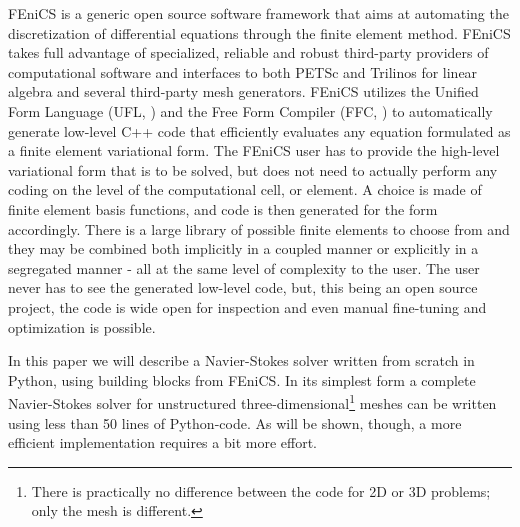 \documentclass[final,3p,times,twocolumn]{elsarticle}
\begin{document}

FEniCS \cite{fenics} is a generic open source software framework that aims at automating the discretization of differential equations through the finite element method. FEniCS takes full advantage of specialized, reliable and robust third-party providers of computational software and interfaces to both PETSc and Trilinos for linear algebra and several third-party mesh generators. FEniCS utilizes the Unified Form Language (UFL, \cite{ufl}) and the Free Form Compiler (FFC, \cite{Kirby:2006}) to automatically generate low-level C++ code that efficiently evaluates any equation formulated as a finite element variational form. The FEniCS user has to provide the high-level variational form that is to be solved, but does not need to actually perform any coding on the level of the computational cell, or element. A choice is made of finite element basis functions, and code is then generated for the form accordingly. There is a large library of possible finite elements to choose from and they may be combined both implicitly in a coupled manner or explicitly in a segregated manner - all at the same level of complexity to the user. The user never has to see the generated low-level code, but, this being an open source project, the code is wide open for inspection and even manual fine-tuning and optimization is possible. 

In this paper we will describe a Navier-Stokes solver written from scratch in Python, using building blocks from FEniCS. In its simplest form a complete Navier-Stokes solver for unstructured three-dimensional\footnote{There is practically no difference between the code for 2D or 3D problems; only the mesh is different.} meshes can be written using less than 50 lines of Python-code. As will be shown, though, a more efficient implementation requires a bit more effort.
\end{document}

